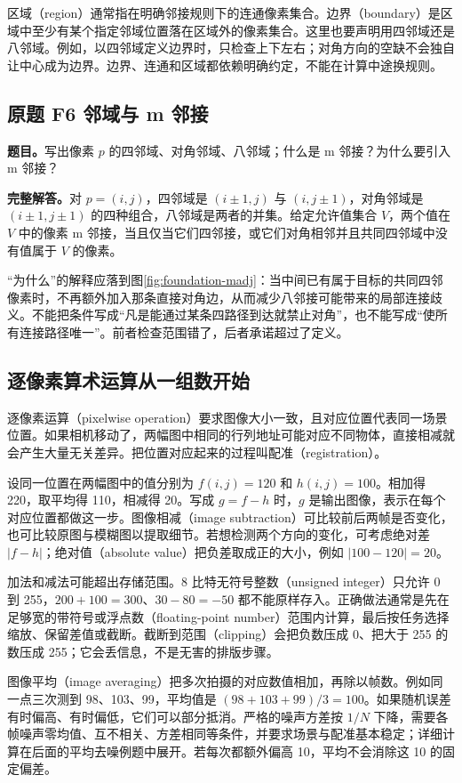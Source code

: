 区域（region）通常指在明确邻接规则下的连通像素集合。边界（boundary）是区域中至少有某个指定邻域位置落在区域外的像素集合。这里也要声明用四邻域还是八邻域。例如，以四邻域定义边界时，只检查上下左右；对角方向的空缺不会独自让中心成为边界。边界、连通和区域都依赖明确约定，不能在计算中途换规则。

\subsection*{原题 F6 邻域与 m 邻接}
\label{original:F6}
\textbf{题目。}写出像素 $p$ 的四邻域、对角邻域、八邻域；什么是 m 邻接？为什么要引入 m 邻接？

\textbf{完整解答。}对 $p=(i,j)$，四邻域是 $(i\!\pm\!1,j)$ 与 $(i,j\!\pm\!1)$，对角邻域是 $(i\!\pm\!1,j\!\pm\!1)$ 的四种组合，八邻域是两者的并集。给定允许值集合 $V$，两个值在 $V$ 中的像素 m 邻接，当且仅当它们四邻接，或它们对角相邻并且共同四邻域中没有值属于 $V$ 的像素。

“为什么”的解释应落到图\ref{fig:foundation-madj}：当中间已有属于目标的共同四邻像素时，不再额外加入那条直接对角边，从而减少八邻接可能带来的局部连接歧义。不能把条件写成“凡是能通过某条四路径到达就禁止对角”，也不能写成“使所有连接路径唯一”。前者检查范围错了，后者承诺超过了定义。

\subsection{逐像素算术运算从一组数开始}

逐像素运算（pixelwise operation）要求图像大小一致，且对应位置代表同一场景位置。如果相机移动了，两幅图中相同的行列地址可能对应不同物体，直接相减就会产生大量无关差异。把位置对应起来的过程叫配准（registration）。

设同一位置在两幅图中的值分别为 $f(i,j)=120$ 和 $h(i,j)=100$。相加得 220，取平均得 110，相减得 20。写成 $g=f-h$ 时，$g$ 是输出图像，表示在每个对应位置都做这一步。图像相减（image subtraction）可比较前后两帧是否变化，也可比较原图与模糊图以提取细节。若想检测两个方向的变化，可考虑绝对差 $|f-h|$；绝对值（absolute value）把负差取成正的大小，例如 $|100-120|=20$。

加法和减法可能超出存储范围。8 比特无符号整数（unsigned integer）只允许 0 到 255，$200+100=300$、$30-80=-50$ 都不能原样存入。正确做法通常是先在足够宽的带符号或浮点数（floating-point number）范围内计算，最后按任务选择缩放、保留差值或截断。截断到范围（clipping）会把负数压成 0、把大于 255 的数压成 255；它会丢信息，不是无害的排版步骤。

图像平均（image averaging）把多次拍摄的对应数值相加，再除以帧数。例如同一点三次测到 98、103、99，平均值是 $(98+103+99)/3=100$。如果随机误差有时偏高、有时偏低，它们可以部分抵消。严格的噪声方差按 $1/N$ 下降，需要各帧噪声零均值、互不相关、方差相同等条件，并要求场景与配准基本稳定；详细计算在后面的平均去噪例题中展开。若每次都额外偏高 10，平均不会消除这 10 的固定偏差。

